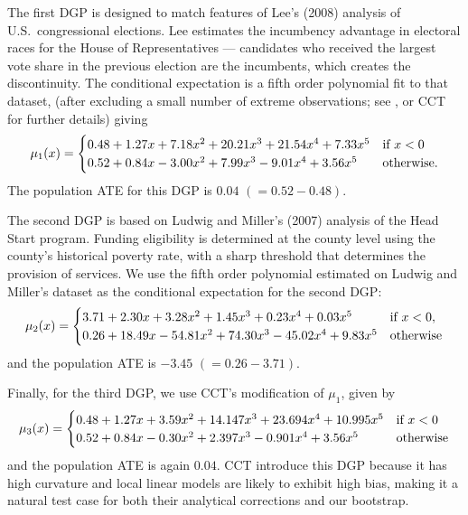 \documentclass[12pt,fleqn]{article}
\begin{document}
\nocite{lee2008rand}%
The first DGP is designed to match features of Lee's (2008) analysis of U.S.\
congressional elections. Lee estimates the incumbency advantage in electoral
races for the House of Representatives --- candidates who received the largest
vote share in the previous election are the incumbents, which creates the
discontinuity. The conditional expectation is a fifth order polynomial fit to
that dataset, (after excluding a small number of extreme observations; see
\citealp{IK}, or CCT for further details) giving
\begin{equation*}
  \mu_{1}(x) =
  \begin{cases}
    0.48 + 1.27x + 7.18x^{2} + 20.21x^{3} + 21.54x^{4} + 7.33x^{5}
    & \text{if}\ x < 0 \\
    0.52 + 0.84x - 3.00x^{2} + 7.99x^3 - 9.01x^4 + 3.56x^{5}
    & \text{otherwise}.
  \end{cases}
\end{equation*}
The population ATE for this DGP is $0.04$ $(= 0.52 - 0.48)$.

\nocite{ludwig2007}%
The second DGP is based on Ludwig and Miller's (2007) analysis of the Head Start
program. Funding eligibility is determined at the county level using the
county's historical poverty rate, with a sharp threshold that determines the
provision of services. We use the fifth order polynomial estimated on Ludwig and
Miller's dataset as the conditional expectation for the second DGP:
\begin{equation*}
  \mu_{2}(x) =
  \begin{cases}
    3.71 + 2.30x + 3.28x^2 + 1.45x^3 + 0.23x^4 + 0.03x^5
    & \text{if}\ x < 0, \\
    0.26 + 18.49x - 54.81x^2 + 74.30x^3 - 45.02x^4 + 9.83x^5
    & \text{otherwise}
  \end{cases}
\end{equation*}
and the population ATE is $-3.45$ $(= 0.26 - 3.71)$.

Finally, for the third DGP, we use CCT's modification of $\mu_1$, given by
\begin{equation*}
  \mu_{3}(x) =
  \begin{cases}
    0.48 + 1.27x + 3.59 x^{2} + 14.147 x^3 + 23.694 x^4 + 10.995 x^5
    & \text{if}\ x < 0 \\
    0.52 + 0.84x - 0.30 x^{2} + 2.397 x^3 - 0.901 x^4 + 3.56 x^5
    & \text{otherwise}
\end{cases}
\end{equation*}
and the population ATE is again $0.04$. CCT introduce this DGP because it has
high curvature and local linear models are likely to exhibit high bias, making
it a natural test case for both their analytical corrections and our bootstrap.
\end{document}
